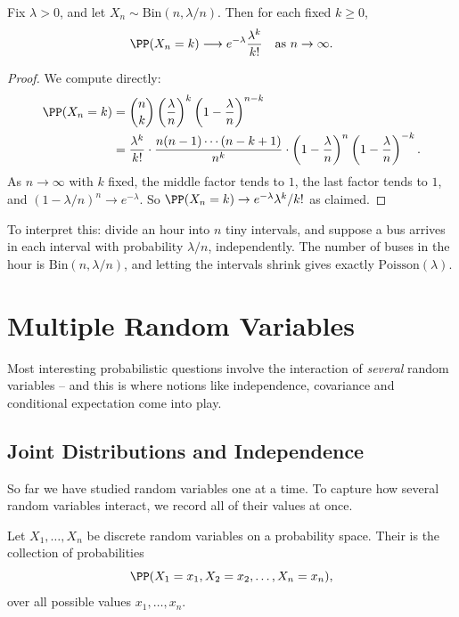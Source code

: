 \begin{theorem}
	Fix $\lambda > 0$, and let $X_n \sim \mathrm{Bin}(n, \lambda/n)$. Then for each fixed $k \geq 0$,
	$$
	\PP(X_n = k) \longrightarrow e^{-\lambda} \frac{\lambda^k}{k!} \quad \text{as } n \rightarrow \infty.
	$$
\end{theorem}
\begin{proof}
	We compute directly:
	\begin{align*}
		\PP(X_n = k) &= \binom{n}{k}\left(\frac{\lambda}{n}\right)^k \left(1 - \frac{\lambda}{n}\right)^{n - k} \\
		&= \frac{\lambda^k}{k!} \cdot \frac{n(n-1)\cdots(n - k + 1)}{n^k} \cdot \left(1 - \frac{\lambda}{n}\right)^{n} \left(1 - \frac{\lambda}{n}\right)^{-k}.
	\end{align*}
	As $n \rightarrow \infty$ with $k$ fixed, the middle factor tends to $1$, the last factor tends to $1$, and $(1 - \lambda/n)^n \rightarrow e^{-\lambda}$. So $\PP(X_n = k) \rightarrow e^{-\lambda}\lambda^k/k!$ as claimed.
\end{proof}

To interpret this: divide an hour into $n$ tiny intervals, and suppose a bus arrives in each interval with probability $\lambda/n$, independently. The number of buses in the hour is $\mathrm{Bin}(n, \lambda/n)$, and letting the intervals shrink gives exactly $\mathrm{Poisson}(\lambda)$.


\section{Multiple Random Variables}

Most interesting probabilistic questions involve the interaction of \emph{several} random variables -- and this is where notions like independence, covariance and conditional expectation come into play.

\subsection{Joint Distributions and Independence}

So far we have studied random variables one at a time. To capture how several random variables interact, we record all of their values at once.

\begin{definition}
	Let $X_1, \dots, X_n$ be discrete random variables on a probability space. Their  is the collection of probabilities
	$$
	\PP(X_1 = x_1, X_2 = x_2, \dots, X_n = x_n),
	$$
	over all possible values $x_1, \dots, x_n$.
\end{definition}

